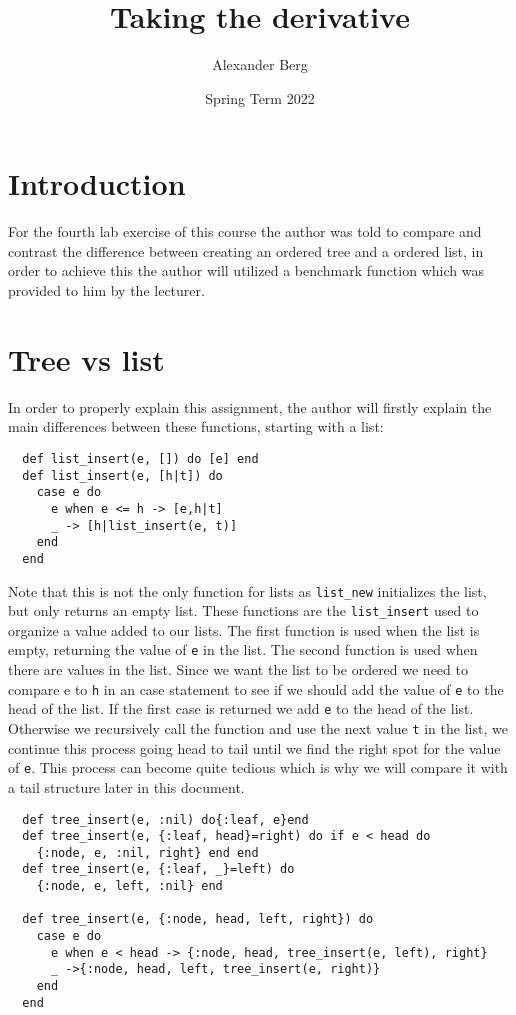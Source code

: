 \documentclass[a4paper,11pt]{article}
\begin{document}
\title{
    \textbf{Taking the derivative}
}
\author{Alexander Berg}
\date{Spring Term 2022}

\maketitle

\section*{Introduction}

For the fourth lab exercise of this course the author was told to compare and contrast the difference between creating an ordered tree and a ordered list, in order to achieve this the author will utilized a benchmark function which was provided to him by the lecturer. 

\section*{Tree vs list}

In order to properly explain this assignment, the author will firstly explain the main differences between these functions, starting with a list:

\begin{verbatim}
  def list_insert(e, []) do [e] end
  def list_insert(e, [h|t]) do
    case e do
      e when e <= h -> [e,h|t]
      _ -> [h|list_insert(e, t)]
    end
  end
\end{verbatim}

Note that this is not the only function for lists as {\tt list\_new} initializes the list, but only returns an empty list. 
These functions are the {\tt list\_insert} used to organize a value added to our lists. The first function is used when the list is empty, returning the value of {\tt e} in the list. The second function is used when there are values in the list. Since we want the list to be ordered we need to compare e to {\tt h} in an case statement to see if we should add the value of {\tt e} to the head of the list. If the first case is returned we add {\tt e} to the head of the list. Otherwise we recursively call the function and use the next value {\tt t} in the list, we continue this process going head to tail until we find the right spot for the value of {\tt e}. This process can become quite tedious which is why we will compare it with a tail structure later in this document.

\begin{verbatim}
  def tree_insert(e, :nil) do{:leaf, e}end
  def tree_insert(e, {:leaf, head}=right) do if e < head do
    {:node, e, :nil, right} end end
  def tree_insert(e, {:leaf, _}=left) do
    {:node, e, left, :nil} end

  def tree_insert(e, {:node, head, left, right}) do
    case e do
      e when e < head -> {:node, head, tree_insert(e, left), right}
      _ ->{:node, head, left, tree_insert(e, right)}
    end
  end


\end{verbatim}
\end{document}
